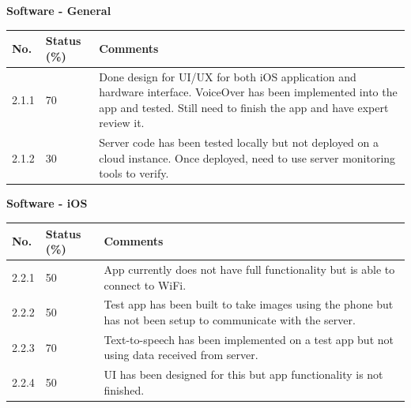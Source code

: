 \documentclass[a4paper,11pt]{article}
\begin{document}
\textbf{Software - General}
\begin{table}[ht]
    \centering
    \begin{tabular}{|p{0.7cm}|p{1cm}|p{12cm}|}
        \hline
        No. & Status (\%) & Comments \\ \hline
        
        2.1.1 & 70 & Done design for UI/UX for both iOS application and hardware interface. VoiceOver has been implemented into the app and tested. Still need to finish the app and have expert review it. \\ \hline
        
        2.1.2 & 30 & Server code has been tested locally but not deployed on a cloud instance. Once deployed, need to use server monitoring tools to verify. \\ \hline
    \end{tabular}
\end{table}

\newpage
\textbf{Software - iOS}
\begin{table}[ht]
    \centering
    \begin{tabular}{|p{0.7cm}|p{1cm}|p{12cm}|}
        \hline
        No. & Status (\%) & Comments \\ \hline
        
        2.2.1 & 50 & App currently does not have full functionality but is able to connect to WiFi. \\ \hline
        
        2.2.2 & 50 & Test app has been built to take images using the phone but has not been setup to communicate with the server. \\ \hline
        
        2.2.3 & 70 & Text-to-speech has been implemented on a test app but not using data received from server. \\ \hline
        
        2.2.4 & 50 & UI has been designed for this but app functionality is not finished. \\ \hline
    \end{tabular}
\end{table}
\end{document}
